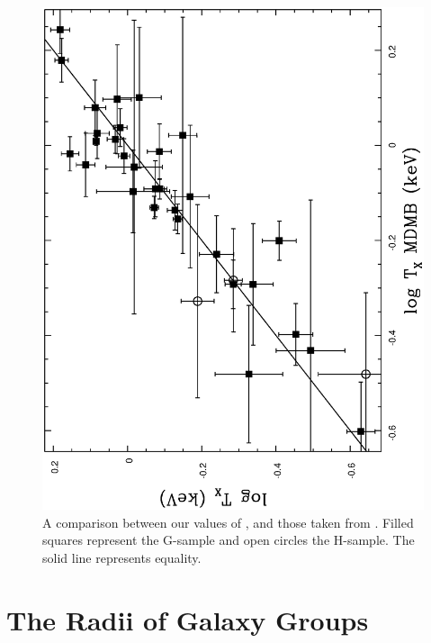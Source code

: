 \documentclass[usenatbib]{mn2e}
\begin{document}
\begin{figure}
\begin{minipage}{241pt}
    \includegraphics[height=\linewidth,angle=270]{fig_09.ps}
    \caption{A comparison between our values of \TX, and those taken from
             \citet{mulchaey03}.  Filled squares represent the G-sample and open
             circles the H-sample.  The solid line represents equality.}
    \label{fig_TX_TXMDMB}

  \end{minipage}
\end{figure}


\section{The Radii of Galaxy Groups}
\label{sec_radius}
\end{document}
